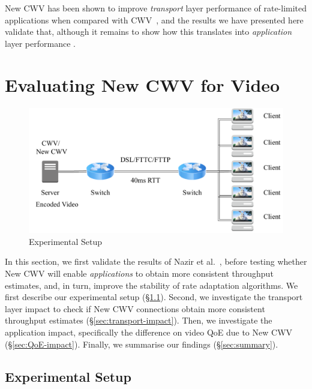 \documentclass[10pt,sigconf]{acmart}
\begin{document}
New CWV has been shown to improve \emph{transport} layer performance of rate-limited applications when compared with CWV~\cite{Nazir-2014-performance-evaluation-congestion-window-validation-dash-newcwv}, and the results we have presented here validate that, although it remains to show how this translates into \emph{application} layer performance \cite{Spiteri-2016-BOLA}. 

\section{Evaluating New CWV for Video}
\label{sec:evaluation}

\begin{figure}
  \centering
  \includegraphics[width=.45\textwidth]{figures/setup.pdf}
  \caption{Experimental Setup}
  \label{fig:experimental-setup}
\end{figure}

In this section, we first validate the results of Nazir et al.~\cite{Nazir-2014-performance-evaluation-congestion-window-validation-dash-newcwv}, before testing whether New CWV will enable \emph{applications} to obtain more consistent throughput estimates, and, in turn, improve the stability of rate adaptation algorithms.
We first describe our experimental setup (\S\ref{sec:experimental-setup}). Second, we investigate the transport layer impact to check if New CWV connections obtain more consistent throughput estimates (\S\ref{sec:transport-impact}). Then, we investigate the application impact, specifically the difference on video QoE due to New CWV (\S\ref{sec:QoE-impact}). Finally, we summarise our findings (\S\ref{sec:summary}).

\subsection{Experimental Setup}
\label{sec:experimental-setup}
\end{document}

